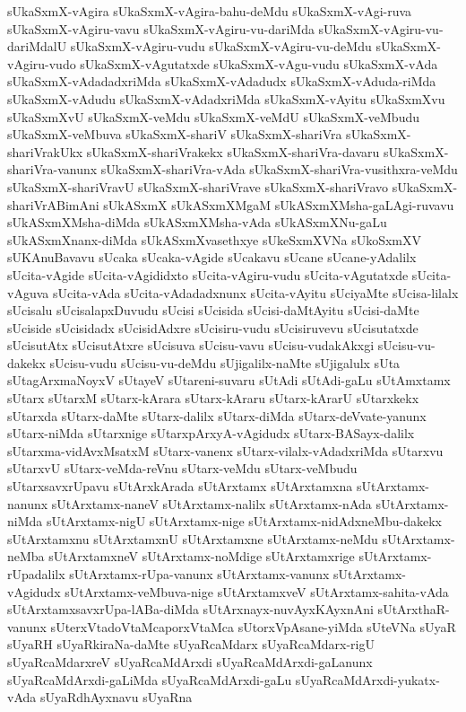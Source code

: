 {sUkaSxmX-vAgira
sUkaSxmX-vAgira-bahu-deMdu
sUkaSxmX-vAgi-ruva
sUkaSxmX-vAgiru-vavu
sUkaSxmX-vAgiru-vu-dariMda
sUkaSxmX-vAgiru-vu-dariMdalU
sUkaSxmX-vAgiru-vudu
sUkaSxmX-vAgiru-vu-deMdu
sUkaSxmX-vAgiru-vudo
sUkaSxmX-vAgutatxde
sUkaSxmX-vAgu-vudu
sUkaSxmX-vAda
sUkaSxmX-vAdadadxriMda
sUkaSxmX-vAdadudx
sUkaSxmX-vAduda-riMda
sUkaSxmX-vAdudu
sUkaSxmX-vAdadxriMda
sUkaSxmX-vAyitu
sUkaSxmXvu
sUkaSxmXvU
sUkaSxmX-veMdu
sUkaSxmX-veMdU
sUkaSxmX-veMbudu
sUkaSxmX-veMbuva
sUkaSxmX-shariV
sUkaSxmX-shariVra
sUkaSxmX-shariVrakUkx
sUkaSxmX-shariVrakekx
sUkaSxmX-shariVra-davaru
sUkaSxmX-shariVra-vanunx
sUkaSxmX-shariVra-vAda
sUkaSxmX-shariVra-vusithxra-veMdu
sUkaSxmX-shariVravU
sUkaSxmX-shariVrave
sUkaSxmX-shariVravo
sUkaSxmX-shariVrABimAni
sUkASxmX
sUkASxmXMgaM
sUkASxmXMsha-gaLAgi-ruvavu
sUkASxmXMsha-diMda
sUkASxmXMsha-vAda
sUkASxmXNu-gaLu
sUkASxmXnanx-diMda
sUkASxmXvasethxye
sUkeSxmXVNa
sUkoSxmXV
sUKAnuBavavu
sUcaka
sUcaka-vAgide
sUcakavu
sUcane
sUcane-yAdalilx
sUcita-vAgide
sUcita-vAgididxto
sUcita-vAgiru-vudu
sUcita-vAgutatxde
sUcita-vAguva
sUcita-vAda
sUcita-vAdadadxnunx
sUcita-vAyitu
sUciyaMte
sUcisa-lilalx
sUcisalu
sUcisalapxDuvudu
sUcisi
sUcisida
sUcisi-daMtAyitu
sUcisi-daMte
sUciside
sUcisidadx
sUcisidAdxre
sUcisiru-vudu
sUcisiruvevu
sUcisutatxde
sUcisutAtx
sUcisutAtxre
sUcisuva
sUcisu-vavu
sUcisu-vudakAkxgi
sUcisu-vu-dakekx
sUcisu-vudu
sUcisu-vu-deMdu
sUjigalilx-naMte
sUjigalulx
sUta
sUtagArxmaNoyxV
sUtayeV
sUtareni-suvaru
sUtAdi
sUtAdi-gaLu
sUtAmxtamx
sUtarx
sUtarxM
sUtarx-kArara
sUtarx-kAraru
sUtarx-kArarU
sUtarxkekx
sUtarxda
sUtarx-daMte
sUtarx-dalilx
sUtarx-diMda
sUtarx-deVvate-yanunx
sUtarx-niMda
sUtarxnige
sUtarxpArxyA-vAgidudx
sUtarx-BASayx-dalilx
sUtarxma-vidAvxMsatxM
sUtarx-vanenx
sUtarx-vilalx-vAdadxriMda
sUtarxvu
sUtarxvU
sUtarx-veMda-reVnu
sUtarx-veMdu
sUtarx-veMbudu
sUtarxsavxrUpavu
sUtArxkArada
sUtArxtamx
sUtArxtamxna
sUtArxtamx-nanunx
sUtArxtamx-naneV
sUtArxtamx-nalilx
sUtArxtamx-nAda
sUtArxtamx-niMda
sUtArxtamx-nigU
sUtArxtamx-nige
sUtArxtamx-nidAdxneMbu-dakekx
sUtArxtamxnu
sUtArxtamxnU
sUtArxtamxne
sUtArxtamx-neMdu
sUtArxtamx-neMba
sUtArxtamxneV
sUtArxtamx-noMdige
sUtArxtamxrige
sUtArxtamx-rUpadalilx
sUtArxtamx-rUpa-vanunx
sUtArxtamx-vanunx
sUtArxtamx-vAgidudx
sUtArxtamx-veMbuva-nige
sUtArxtamxveV
sUtArxtamx-sahita-vAda
sUtArxtamxsavxrUpa-lABa-diMda
sUtArxnayx-nuvAyxKAyxnAni
sUtArxthaR-vanunx
sUterxVtadoVtaMcaporxVtaMca
sUtorxVpAsane-yiMda
sUteVNa
sUyaR
sUyaRH
sUyaRkiraNa-daMte
sUyaRcaMdarx
sUyaRcaMdarx-rigU
sUyaRcaMdarxreV
sUyaRcaMdArxdi
sUyaRcaMdArxdi-gaLanunx
sUyaRcaMdArxdi-gaLiMda
sUyaRcaMdArxdi-gaLu
sUyaRcaMdArxdi-yukatx-vAda
sUyaRdhAyxnavu
sUyaRna
}

